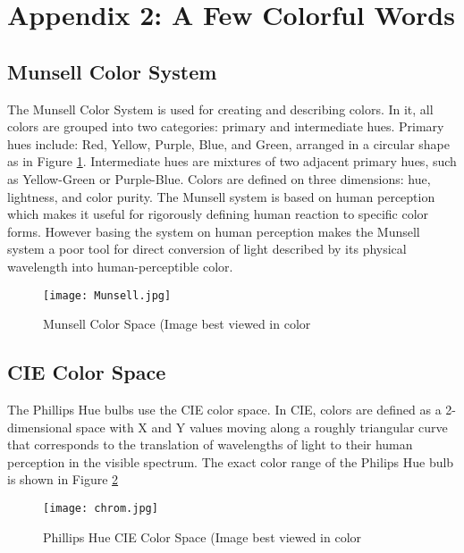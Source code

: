 \documentclass{llncs}
\begin{document}
\section*{Appendix 2: A Few Colorful Words}
\label{app:colors}
%
\subsection*{Munsell Color System}
%
The Munsell Color System is used for creating and describing colors. In it, 
all colors are grouped into two categories: primary and intermediate hues. 
Primary hues include: Red, Yellow, Purple, Blue, and Green, arranged in a circular 
shape as in Figure \ref{fig:Munsell}. Intermediate hues are mixtures of two adjacent 
primary hues, such as Yellow-Green or Purple-Blue. Colors are defined on three 
dimensions: hue, lightness, and color purity. The Munsell system is based on human 
perception which makes it useful for rigorously defining human reaction to specific color forms. 
However basing the system on human perception makes the Munsell system a poor tool for 
direct conversion of light described by its physical wavelength into human-perceptible color.
%
\begin{figure}
    \centering
    \begin{minipage}{0.45\textwidth}
        \centering
\texttt{[image: Munsell.jpg]}
\caption{{\small {\small  Munsell Color Space (Image best viewed in color}}}
\label{fig:Munsell}
\end{minipage}
\end{figure} 

\subsection*{CIE Color Space}

The Phillips Hue bulbs use the CIE color space. In CIE, 
colors are defined as a 2-dimensional space with X and Y values moving along a roughly 
triangular curve that corresponds to the translation of wavelengths of light to their human 
perception in the visible spectrum. The exact color range of the Philips Hue bulb is 
shown in Figure \ref{fig:chrom}
%
\begin{figure}	
    \centering
    \begin{minipage}{0.45\textwidth}
        \centering
\texttt{[image: chrom.jpg]}
\caption{{\small {\small  Phillips Hue CIE Color Space (Image best viewed in color}}}
\label{fig:chrom}
\end{minipage}
\end{figure} 
\end{document}
